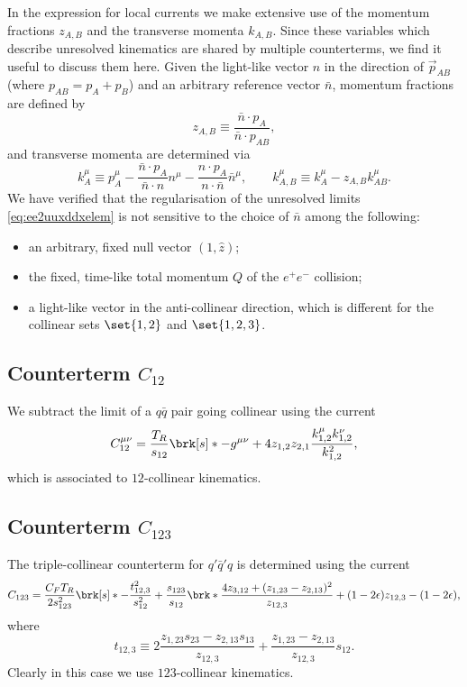 \documentclass[11pt,a4paper]{article}
\newcommand{\eps}[0]{\epsilon}
\begin{document}
In the expression for local currents
we make extensive use of the momentum fractions $z_{A,B}$
and the transverse momenta $k_{A,B}$.
Since these variables which describe unresolved kinematics
are shared by multiple counterterms,
we find it useful to discuss them here.
Given the light-like vector $n$ in the direction of $\vec{p}_{AB}$
(where $p_{AB} = p_A+p_B$)
and an arbitrary reference vector $\bar{n}$,
momentum fractions are defined by
\begin{equation}
	z_{A,B} \equiv \frac{\bar{n}\cdot p_A}{\bar{n}\cdot p_{AB}},
\end{equation}
and transverse momenta are determined via
\begin{equation}
	k_A^\mu \equiv p_A^\mu
	- \frac{\bar{n}\cdot p_A}{\bar{n}\cdot n} n^\mu
	- \frac{n \cdot p_A}{n\cdot\bar{n}} \bar{n}^\mu,
	\qquad
	k_{A,B}^\mu \equiv k_A^\mu - z_{A,B} k_{AB}^\mu.
\end{equation}
We have verified that the regularisation
of the unresolved limits \cref{eq:ee2uuxddxelem}
is not sensitive to the choice of $\bar{n}$ among the following:
\begin{itemize}
	\item an arbitrary, fixed null vector $(1, \hat{z})$;
	\item the fixed, time-like total momentum $Q$ of the $e^+ e^-$ collision;
	\item a light-like vector in the anti-collinear direction,
	which is different for the collinear sets $\set{1,2}$ and $\set{1,2,3}$.
\end{itemize}


\subsection{Counterterm $C_{12}$}

We subtract the limit of a $q\bar{q}$ pair going collinear using the current
\begin{equation}
\label{eq:Pqq}
	C_{12}^{\mu\nu} = \frac{T_R}{s_{12}} \brk[s]*{
		- g^{\mu\nu}
		+ 4 z_{1,2} z_{2,1} \frac{k_{1,2}^\mu k_{1,2}^\nu}{k_{1,2}^2}
	},
\end{equation}
which is associated to $12$-collinear kinematics.


\subsection{Counterterm $C_{123}$}

The triple-collinear counterterm for $q'\bar{q}'q$
is determined using the current \cite{Catani:1999ss}
\begin{equation}
	C_{123} = \frac{C_F T_R}{2 s_{123}^2} \brk[s]*{
		- \frac{t_{12,3}^2}{s_{12}^2}
		+ \frac{s_{123}}{s_{12}} \brk*{
			\frac{4 z_{3,12} + (z_{1,23} - z_{2,13})^2}{z_{12,3}}
			+(1 - 2\eps) z_{12,3}
		}
		- (1 - 2\eps)
	},
\end{equation}
where
\begin{equation}
	t_{12,3}
	\equiv 2 \frac{z_{1,23} s_{23} - z_{2,13} s_{13}}{z_{12,3}}
	+ \frac{z_{1,23} - z_{2,13}}{z_{12,3}} s_{12}.
\end{equation}
Clearly in this case we use $123$-collinear kinematics.
\end{document}
